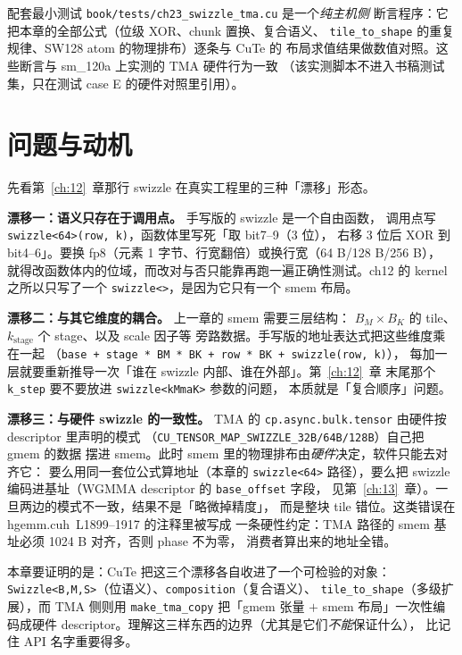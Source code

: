 配套最小测试 \texttt{book/\allowbreak{}tests/\allowbreak{}ch23\_\allowbreak{}swizzle\_\allowbreak{}tma.cu} 是一个\emph{纯主机侧}
断言程序：它把本章的全部公式（位级 XOR、chunk 置换、复合语义、
\texttt{tile\_\allowbreak{}to\_\allowbreak{}shape} 的重复规律、SW128 atom 的物理排布）逐条与 CuTe 的
布局求值结果做数值对照。这些断言与 sm\_120a 上实测的 TMA 硬件行为一致
（该实测脚本不进入书稿测试集，只在测试 case E 的硬件对照里引用）。

\section{问题与动机}

先看第~\ref{ch:12}~章那行 swizzle 在真实工程里的三种「漂移」形态。

\textbf{漂移一：语义只存在于调用点。} 手写版的 swizzle 是一个自由函数，
调用点写 \texttt{swizzle\allowbreak{}<64>\allowbreak{}(row,\allowbreak{} k)}，函数体里写死「取 bit7--9（3 位），
右移 3 位后 XOR 到 bit4--6」。要换 fp8（元素 1 字节、行宽翻倍）或换行宽（64 B/128 B/256 B），
就得改函数体内的位域，而改对与否只能靠再跑一遍正确性测试。ch12 的 kernel
之所以只写了一个 \texttt{swizzle<>}，是因为它只有一个 smem 布局。

\textbf{漂移二：与其它维度的耦合。} 上一章的 smem 需要三层结构：
$B_M\times B_K$ 的 tile、$k_{\text{stage}}$ 个 stage、以及 scale 因子等
旁路数据。手写版的地址表达式把这些维度乘在一起
（\texttt{base + stage * BM * BK + row * BK + swizzle\allowbreak{}(row,\allowbreak{} k)}），
每加一层就要重新推导一次「谁在 swizzle 内部、谁在外部」。第~\ref{ch:12}~章
末尾那个 \texttt{k\_step} 要不要放进 \texttt{swizzle\allowbreak{}<k\allowbreak{}Mma\allowbreak{}K>} 参数的问题，
本质就是「复合顺序」问题。

\textbf{漂移三：与硬件 swizzle 的一致性。} TMA 的
\texttt{cp.\allowbreak{}async.\allowbreak{}bulk.\allowbreak{}tensor} 由硬件按 descriptor 里声明的模式
（\texttt{CU\_\allowbreak{}TENSOR\_\allowbreak{}MAP\_\allowbreak{}SWIZZLE\_\allowbreak{}32B/\allowbreak{}64B/\allowbreak{}128B}）自己把 gmem 的数据
摆进 smem。此时 smem 里的物理排布由\emph{硬件}决定，软件只能去对齐它：
要么用同一套位公式算地址（本章的 \texttt{swizzle<64>} 路径），要么把
swizzle 编码进基址（WGMMA descriptor 的 \texttt{base\_offset} 字段，
见第~\ref{ch:13}~章）。一旦两边的模式不一致，结果不是「略微掉精度」，
而是整块 tile 错位。这类错误在 hgemm.cuh~L1899--1917 的注释里被写成
一条硬性约定：TMA 路径的 smem 基址必须 1024 B 对齐，否则 phase 不为零，
消费者算出来的地址全错。

本章要证明的是：CuTe 把这三个漂移各自收进了一个可检验的对象：
\texttt{Swizzle\allowbreak{}<B,\allowbreak{}M,\allowbreak{}S>}（位语义）、\texttt{composition}（复合语义）、
\texttt{tile\_\allowbreak{}to\_\allowbreak{}shape}（多级扩展），而 TMA 侧则用
\texttt{make\_\allowbreak{}tma\_\allowbreak{}copy} 把「gmem 张量 $+$ smem 布局」一次性编码成硬件
descriptor。理解这三样东西的边界（尤其是它们\emph{不能}保证什么），
比记住 API 名字重要得多。

